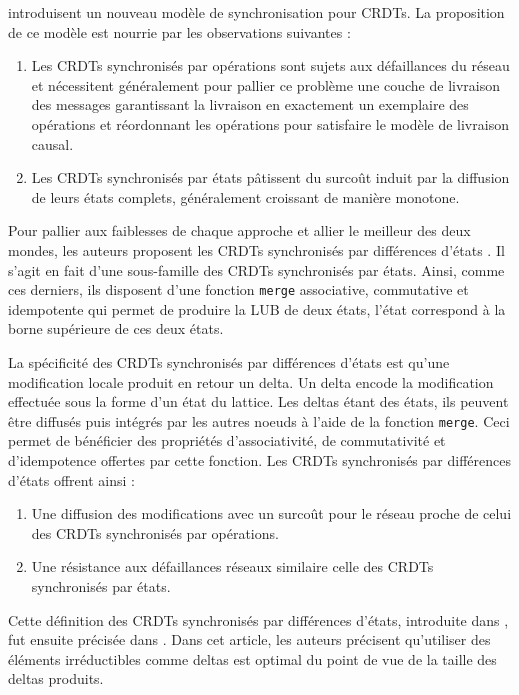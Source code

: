 \label{sec:delta-crdts}

\textcite{almeida2015delta} introduisent un nouveau modèle de synchronisation pour \acp{CRDT}.
La proposition de ce modèle est nourrie par les observations suivantes :
\begin{enumerate}
  \item Les \acp{CRDT} synchronisés par opérations sont sujets aux défaillances du réseau et nécessitent généralement pour pallier ce problème une couche de livraison des messages garantissant la livraison en exactement un exemplaire des opérations et réordonnant les opérations pour satisfaire le modèle de livraison causal.
  \item Les \acp{CRDT} synchronisés par états pâtissent du surcoût induit par la diffusion de leurs états complets, généralement croissant de manière monotone.
\end{enumerate}

Pour pallier aux faiblesses de chaque approche et allier le meilleur des deux mondes, les auteurs proposent les \acp{CRDT} synchronisés par différences d'états \cite{almeida2015delta,Almeida_2018, enes2019}.
Il s'agit en fait d'une sous-famille des \acp{CRDT} synchronisés par états.
Ainsi, comme ces derniers, ils disposent d'une fonction \texttt{merge} associative, commutative et idempotente qui permet de produire la \ac{LUB} de deux états, \ie l'état correspond à la borne supérieure de ces deux états.

La spécificité des \acp{CRDT} synchronisés par différences d'états est qu'une modification locale produit en retour un delta.
Un delta encode la modification effectuée sous la forme d'un état du lattice.
Les deltas étant des états, ils peuvent être diffusés puis intégrés par les autres noeuds à l'aide de la fonction \texttt{merge}.
Ceci permet de bénéficier des propriétés d'associativité, de commutativité et d'idempotence offertes par cette fonction.
Les \acp{CRDT} synchronisés par différences d'états offrent ainsi :
\begin{enumerate}
  \item Une diffusion des modifications avec un surcoût pour le réseau proche de celui des \acp{CRDT} synchronisés par opérations.
  \item Une résistance aux défaillances réseaux similaire celle des \acp{CRDT} synchronisés par états.
\end{enumerate}

Cette définition des \acp{CRDT} synchronisés par différences d'états, introduite dans \cite{almeida2015delta,Almeida_2018}, fut ensuite précisée dans \cite{enes2019}.
Dans cet article, les auteurs précisent qu'utiliser des éléments irréductibles  comme deltas est optimal du point de vue de la taille des deltas produits.

